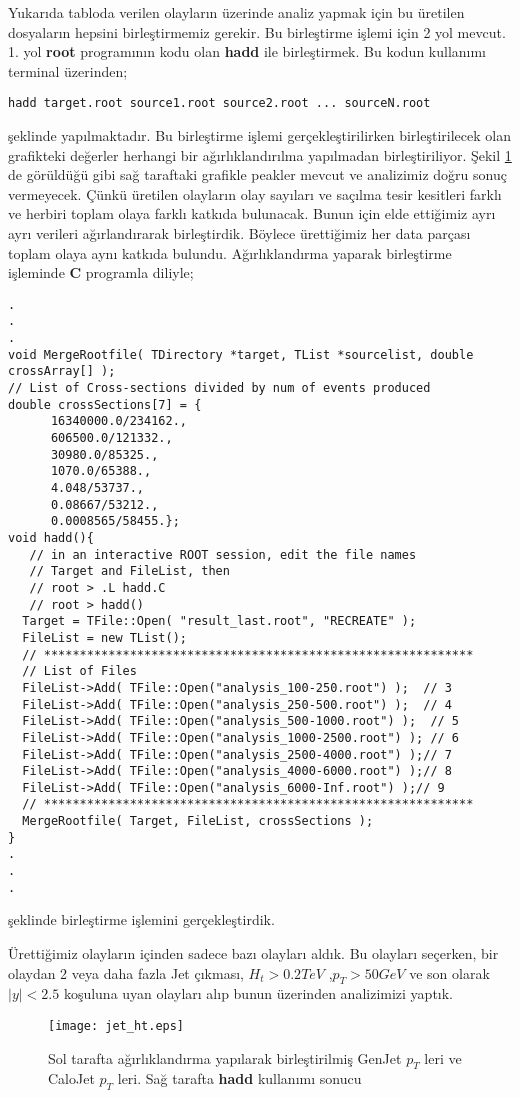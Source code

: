 \par Yukarıda tabloda verilen olayların üzerinde analiz yapmak için bu üretilen dosyaların hepsini birleştirmemiz gerekir. Bu birleştirme işlemi için 2 yol mevcut. 1. yol \textbf{root} programının kodu olan \textbf{hadd} ile birleştirmek. Bu kodun kullanımı terminal üzerinden;
\begin{lstlisting}
hadd target.root source1.root source2.root ... sourceN.root
\end{lstlisting}
şeklinde yapılmaktadır. Bu birleştirme işlemi gerçekleştirilirken birleştirilecek olan grafikteki değerler herhangi bir ağırlıklandırılma yapılmadan birleştiriliyor. Şekil \ref{fig:hadd} de görüldüğü gibi sağ taraftaki grafikle peakler mevcut ve analizimiz doğru sonuç vermeyecek. Çünkü üretilen olayların olay sayıları ve saçılma tesir kesitleri farklı ve herbiri toplam olaya farklı katkıda bulunacak. Bunun için elde ettiğimiz ayrı ayrı verileri ağırlandırarak birleştirdik. Böylece ürettiğimiz her data parçası toplam olaya aynı katkıda bulundu. Ağırlıklandırma yaparak birleştirme işleminde \textbf{C} programla diliyle;
\begin{lstlisting}
.
.
.
void MergeRootfile( TDirectory *target, TList *sourcelist, double crossArray[] );
// List of Cross-sections divided by num of events produced
double crossSections[7] = {
      16340000.0/234162.,
      606500.0/121332.,
      30980.0/85325.,
      1070.0/65388.,
      4.048/53737.,
      0.08667/53212.,
      0.0008565/58455.};
void hadd(){
   // in an interactive ROOT session, edit the file names
   // Target and FileList, then
   // root > .L hadd.C
   // root > hadd()
  Target = TFile::Open( "result_last.root", "RECREATE" );
  FileList = new TList();
  // ************************************************************
  // List of Files
  FileList->Add( TFile::Open("analysis_100-250.root") );  // 3
  FileList->Add( TFile::Open("analysis_250-500.root") );  // 4
  FileList->Add( TFile::Open("analysis_500-1000.root") );  // 5
  FileList->Add( TFile::Open("analysis_1000-2500.root") ); // 6
  FileList->Add( TFile::Open("analysis_2500-4000.root") );// 7
  FileList->Add( TFile::Open("analysis_4000-6000.root") );// 8
  FileList->Add( TFile::Open("analysis_6000-Inf.root") );// 9
  // ************************************************************
  MergeRootfile( Target, FileList, crossSections );
}
.
.
.
\end{lstlisting}
şeklinde birleştirme işlemini gerçekleştirdik.
\par Ürettiğimiz olayların içinden sadece bazı olayları aldık. Bu olayları seçerken, bir olaydan 2 veya daha fazla Jet çıkması, $H_t > 0.2 TeV$ ,$p_T > 50 GeV$ ve son olarak $|y|< 2.5$ koşuluna uyan olayları alıp bunun üzerinden analizimizi yaptık.
\begin{figure}[!htpb]
\centering
\texttt{[image: jet\_ht.eps]}
\caption{Sol tarafta ağırlıklandırma yapılarak birleştirilmiş GenJet $p_T$ leri ve CaloJet $p_T$ leri. Sağ tarafta \textbf{hadd} kullanımı sonucu}
\label{fig:hadd}
\end{figure}

